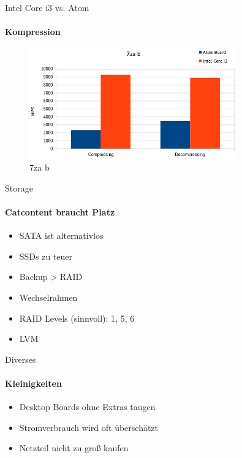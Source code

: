 \begin{frame}{Intel Core i3 vs. Atom}
\framesubtitle{Kompression}
\begin{figure}
\includegraphics[width=0.8\textwidth]{images/7zab-benchmark.png}
\caption{7za b}
\end{figure}
\end{frame}

\begin{frame}{Storage}
\framesubtitle{Catcontent braucht Platz}
\begin{itemize}
\item SATA ist alternativlos
\pause
\item SSDs zu teuer
\pause
\item Backup > RAID
\pause
\item Wechselrahmen
\pause
\item RAID Levels (sinnvoll): 1, 5, 6
\pause
\item LVM
\end{itemize}
\end{frame}

\begin{frame}{Diverses}
\framesubtitle{Kleinigkeiten}
\begin{itemize}
\item Desktop Boards ohne Extras taugen
\pause
\item Stromverbrauch wird oft überschätzt
\pause
\item Netzteil nicht zu groß kaufen
\end{itemize}
\end{frame}
